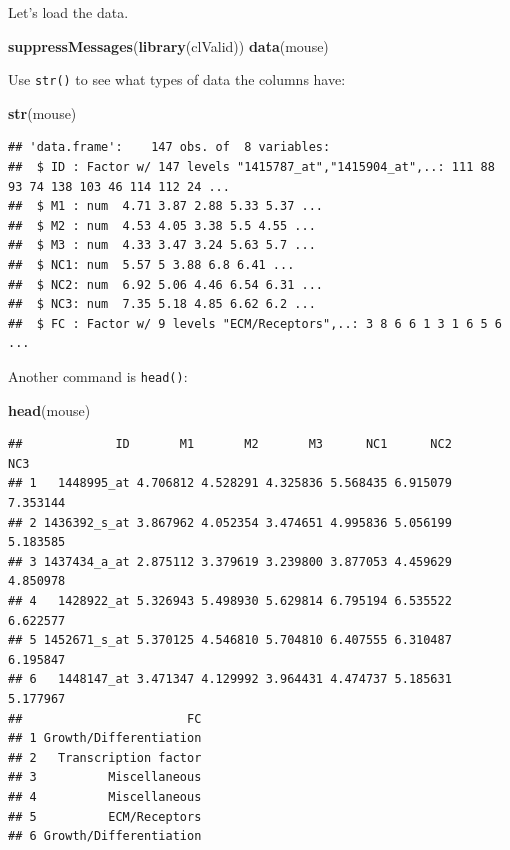 \documentclass[
]{book}
\newenvironment{Shaded}{\begin{snugshade}}{\end{snugshade}}
\newcommand{\FunctionTok}[1]{\textcolor[rgb]{0.13,0.29,0.53}{\textbf{#1}}}
\newcommand{\NormalTok}[1]{#1}
\begin{document}
Let's load the data.

\begin{Shaded}
\begin{Highlighting}[]
\FunctionTok{suppressMessages}\NormalTok{(}\FunctionTok{library}\NormalTok{(clValid))}
\FunctionTok{data}\NormalTok{(mouse)}
\end{Highlighting}
\end{Shaded}

Use \texttt{str()} to see what types of data the columns have:

\begin{Shaded}
\begin{Highlighting}[]
\FunctionTok{str}\NormalTok{(mouse)}
\end{Highlighting}
\end{Shaded}

\begin{verbatim}
## 'data.frame':    147 obs. of  8 variables:
##  $ ID : Factor w/ 147 levels "1415787_at","1415904_at",..: 111 88 93 74 138 103 46 114 112 24 ...
##  $ M1 : num  4.71 3.87 2.88 5.33 5.37 ...
##  $ M2 : num  4.53 4.05 3.38 5.5 4.55 ...
##  $ M3 : num  4.33 3.47 3.24 5.63 5.7 ...
##  $ NC1: num  5.57 5 3.88 6.8 6.41 ...
##  $ NC2: num  6.92 5.06 4.46 6.54 6.31 ...
##  $ NC3: num  7.35 5.18 4.85 6.62 6.2 ...
##  $ FC : Factor w/ 9 levels "ECM/Receptors",..: 3 8 6 6 1 3 1 6 5 6 ...
\end{verbatim}

Another command is \texttt{head()}:

\begin{Shaded}
\begin{Highlighting}[]
\FunctionTok{head}\NormalTok{(mouse)}
\end{Highlighting}
\end{Shaded}

\begin{verbatim}
##             ID       M1       M2       M3      NC1      NC2      NC3
## 1   1448995_at 4.706812 4.528291 4.325836 5.568435 6.915079 7.353144
## 2 1436392_s_at 3.867962 4.052354 3.474651 4.995836 5.056199 5.183585
## 3 1437434_a_at 2.875112 3.379619 3.239800 3.877053 4.459629 4.850978
## 4   1428922_at 5.326943 5.498930 5.629814 6.795194 6.535522 6.622577
## 5 1452671_s_at 5.370125 4.546810 5.704810 6.407555 6.310487 6.195847
## 6   1448147_at 3.471347 4.129992 3.964431 4.474737 5.185631 5.177967
##                       FC
## 1 Growth/Differentiation
## 2   Transcription factor
## 3          Miscellaneous
## 4          Miscellaneous
## 5          ECM/Receptors
## 6 Growth/Differentiation
\end{verbatim}
\end{document}
